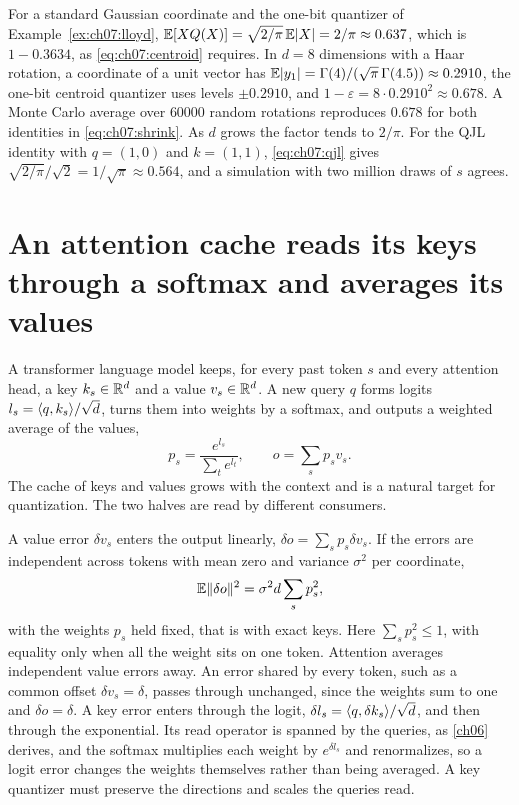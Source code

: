 \begin{example}\label{ex:ch07:bias}
For a standard Gaussian coordinate and the one-bit quantizer of Example~\ref{ex:ch07:lloyd}, $\mathbb{E}[XQ(X)]=\sqrt{2/\pi}\,\mathbb{E}|X|=2/\pi\approx0.637$, which is $1-0.3634$, as \cref{eq:ch07:centroid} requires. In $d=8$ dimensions with a Haar rotation, a coordinate of a unit vector has $\mathbb{E}|y_1|=\Gamma(4)/(\sqrt\pi\,\Gamma(4.5))\approx0.2910$, the one-bit centroid quantizer uses levels $\pm0.2910$, and $1-\varepsilon=8\cdot0.2910^2\approx0.678$. A Monte Carlo average over $60000$ random rotations reproduces $0.678$ for both identities in \cref{eq:ch07:shrink}. As $d$ grows the factor tends to $2/\pi$. For the QJL identity with $q=(1,0)$ and $k=(1,1)$, \cref{eq:ch07:qjl} gives $\sqrt{2/\pi}/\sqrt2=1/\sqrt\pi\approx0.564$, and a simulation with two million draws of $s$ agrees.
\end{example}


\section{An attention cache reads its keys through a softmax and averages its values}\label{sec:ch07:kv}

A transformer language model keeps, for every past token $s$ and every attention head, a key $k_s\in\mathbb{R}^d$ and a value $v_s\in\mathbb{R}^d$. A new query $q$ forms logits $l_s=\langle q,k_s\rangle/\sqrt d$, turns them into weights by a softmax, and outputs a weighted average of the values,
\begin{equation}\label{eq:ch07:attn}
p_s=\frac{e^{l_s}}{\sum_te^{l_t}},\qquad o=\sum_sp_sv_s .
\end{equation}
The cache of keys and values grows with the context and is a natural target for quantization. The two halves are read by different consumers.

A value error $\delta v_s$ enters the output linearly, $\delta o=\sum_sp_s\delta v_s$. If the errors are independent across tokens with mean zero and variance $\sigma^2$ per coordinate,
\begin{equation}\label{eq:ch07:valavg}
\mathbb{E}\lVert \delta o\rVert^2=\sigma^2d\sum_sp_s^2 ,
\end{equation}
with the weights $p_s$ held fixed, that is with exact keys. Here $\sum_sp_s^2\le1$, with equality only when all the weight sits on one token. Attention averages independent value errors away. An error shared by every token, such as a common offset $\delta v_s=\delta$, passes through unchanged, since the weights sum to one and $\delta o=\delta$. A key error enters through the logit, $\delta l_s=\langle q,\delta k_s\rangle/\sqrt d$, and then through the exponential. Its read operator is spanned by the queries, as \cref{ch06} derives, and the softmax multiplies each weight by $e^{\delta l_s}$ and renormalizes, so a logit error changes the weights themselves rather than being averaged. A key quantizer must preserve the directions and scales the queries read.

